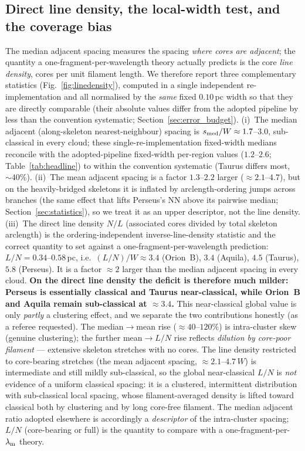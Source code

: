 \documentclass[usenatbib,twoside,twocolumn]{mnras}
\begin{document}
\subsection{Direct line density, the local-width test, and the coverage bias}
\label{sec:linedensity}
The median adjacent spacing measures the spacing \emph{where cores are adjacent}; the quantity a one-fragment-per-wavelength theory actually predicts is the core \emph{line density}, cores per unit filament length. We therefore report three complementary statistics (Fig.~\ref{fig:linedensity}), computed in a single independent re-implementation and all normalised by the \emph{same} fixed $0.10$\,pc width so that they are directly comparable (their absolute values differ from the adopted pipeline by less than the convention systematic; Section~\ref{sec:error_budget}). (i)~The median adjacent (along-skeleton nearest-neighbour) spacing is $s_{\rm med}/W\approx1.7$--$3.0$, sub-classical in every cloud; these single-re-implementation fixed-width medians reconcile with the adopted-pipeline fixed-width per-region values ($1.2$--$2.6$; Table~\ref{tab:headline}) to within the convention systematic (Taurus differs most, $\sim40\%$). (ii)~The mean adjacent spacing is a factor $1.3$--$2.2$ larger ($\approx2.1$--$4.7$), but on the heavily-bridged skeletons it is inflated by arclength-ordering jumps across branches (the same effect that lifts Perseus's NN above its pairwise median; Section~\ref{sec:statistics}), so we treat it as an upper descriptor, not the line density. (iii)~The direct line density $N/L$ (associated cores divided by total skeleton arclength) is the ordering-independent inverse-line-density statistic and the correct quantity to set against a one-fragment-per-wavelength prediction: $L/N=0.34$--$0.58$\,pc, i.e.\ $(L/N)/W\approx3.4$ (Orion~B), $3.4$ (Aquila), $4.5$ (Taurus), $5.8$ (Perseus). It is a factor $\approx2$ larger than the median adjacent spacing in every cloud. \textbf{On the direct line density the deficit is therefore much milder: Perseus is essentially classical and Taurus near-classical, while Orion~B and Aquila remain sub-classical at $\approx3.4$.} This near-classical global value is only \emph{partly} a clustering effect, and we separate the two contributions honestly (as a referee requested). The median$\to$mean rise ($\approx40$--$120\%$) is intra-cluster skew (genuine clustering); the further mean$\to L/N$ rise reflects \emph{dilution by core-poor filament} --- extensive skeleton stretches with no cores. The line density restricted to core-bearing stretches (the mean adjacent spacing, $\approx2.1$--$4.7\,W$) is intermediate and still mildly sub-classical, so the global near-classical $L/N$ is \emph{not} evidence of a uniform classical spacing: it is a clustered, intermittent distribution with sub-classical local spacing, whose filament-averaged density is lifted toward classical both by clustering and by long core-free filament. The median adjacent ratio adopted elsewhere is accordingly a \emph{descriptor} of the intra-cluster spacing; $L/N$ (core-bearing or full) is the quantity to compare with a one-fragment-per-$\lambda_{\rm m}$ theory.
\end{document}
